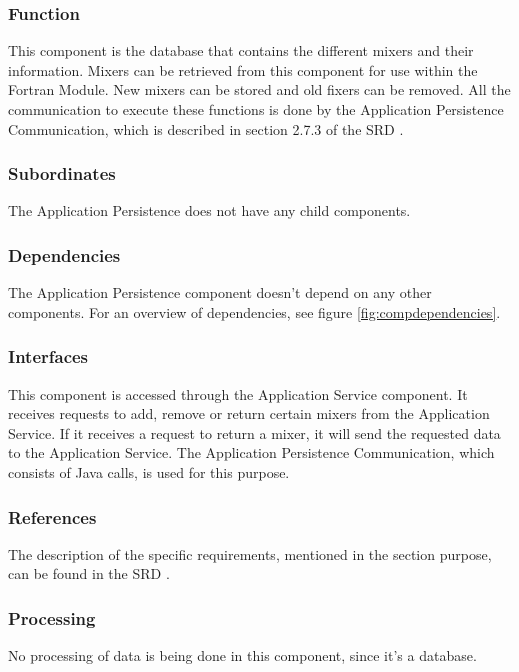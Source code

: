 \subsubsection*{Function}
This component is the database that contains the different mixers and their information. Mixers can be retrieved from this component for use within the Fortran Module. New mixers can be stored and old fixers can be removed. All the communication to execute these functions is done by the Application Persistence Communication, which is described in section 2.7.3 of the SRD \cite{srd}.

\subsubsection*{Subordinates}
The Application Persistence does not have any child components.

\subsubsection*{Dependencies}
The Application Persistence component doesn't depend on any other components. For an overview of dependencies, see figure \ref{fig:compdependencies}.

\subsubsection*{Interfaces}
This component is accessed through the Application Service component. It receives requests to add, remove or return certain mixers from the Application Service. If it receives a request to return a mixer, it will send the requested data to the Application Service. The Application Persistence Communication, which consists of Java calls, is used for this purpose.

\subsubsection*{References}
The description of the specific requirements, mentioned in the section purpose, can be found in the SRD \cite{srd}.

\subsubsection*{Processing}
No processing of data is being done in this component, since it's a database.

